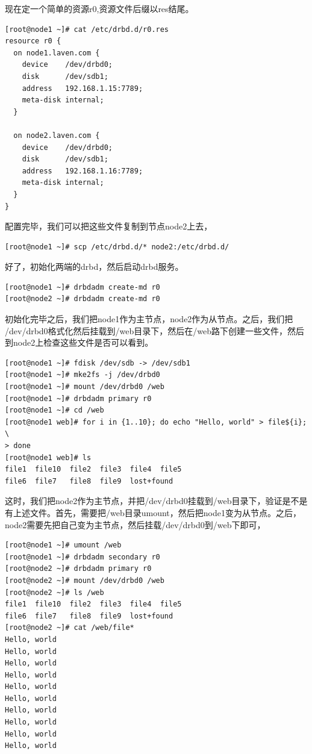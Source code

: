 现在定一个简单的资源r0,资源文件后缀以res结尾。

\small{
\begin{verbatim}
[root@node1 ~]# cat /etc/drbd.d/r0.res 
resource r0 {
  on node1.laven.com {
    device    /dev/drbd0;
    disk      /dev/sdb1;
    address   192.168.1.15:7789;
    meta-disk internal;
  }

  on node2.laven.com {
    device    /dev/drbd0;
    disk      /dev/sdb1;
    address   192.168.1.16:7789;
    meta-disk internal;
  }
}
\end{verbatim}
}
\normalsize

配置完毕，我们可以把这些文件复制到节点node2上去，

\small{
\begin{verbatim}
[root@node1 ~]# scp /etc/drbd.d/* node2:/etc/drbd.d/
\end{verbatim}
}
\normalsize

好了，初始化两端的drbd，然后启动drbd服务。

\small{
\begin{verbatim}
[root@node1 ~]# drbdadm create-md r0
[root@node2 ~]# drbdadm create-md r0
\end{verbatim}
}
\normalsize

初始化完毕之后，我们把node1作为主节点，node2作为从节点。之后，我们把
/dev/drbd0格式化然后挂载到/web目录下，然后在/web路下创建一些文件，然后
到node2上检查这些文件是否可以看到。

\small{
\begin{verbatim}
[root@node1 ~]# fdisk /dev/sdb -> /dev/sdb1
[root@node1 ~]# mke2fs -j /dev/drbd0
[root@node1 ~]# mount /dev/drbd0 /web
[root@node1 ~]# drbdadm primary r0
[root@node1 ~]# cd /web
[root@node1 web]# for i in {1..10}; do echo "Hello, world" > file${i}; \
> done
[root@node1 web]# ls
file1  file10  file2  file3  file4  file5  
file6  file7   file8  file9  lost+found
\end{verbatim}
}
\normalsize

这时，我们把node2作为主节点，并把/dev/drbd0挂载到/web目录下，验证是不是
有上述文件。首先，需要把/web目录umount，然后把node1变为从节点。之后，
node2需要先把自己变为主节点，然后挂载/dev/drbd0到/web下即可，

\small{
\begin{verbatim}
[root@node1 ~]# umount /web
[root@node1 ~]# drbdadm secondary r0
[root@node2 ~]# drbdadm primary r0
[root@node2 ~]# mount /dev/drbd0 /web
[root@node2 ~]# ls /web
file1  file10  file2  file3  file4  file5  
file6  file7   file8  file9  lost+found
[root@node2 ~]# cat /web/file*
Hello, world
Hello, world
Hello, world
Hello, world
Hello, world
Hello, world
Hello, world
Hello, world
Hello, world
Hello, world
\end{verbatim}
}
\normalsize
